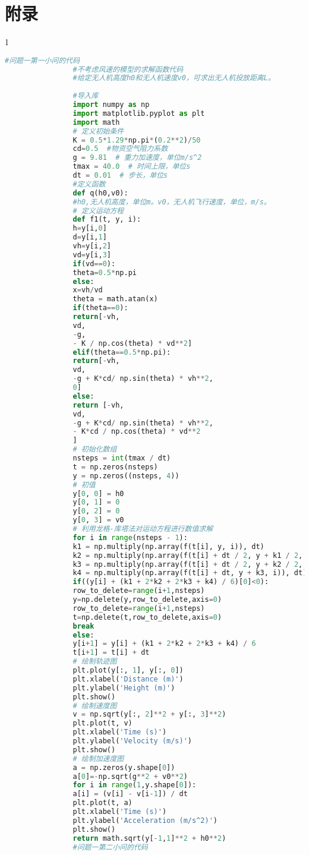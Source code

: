\documentclass[normalsize]{ctexart}
\begin{document}
		\section{附录}
			\usepackage{第一二问的Python源程序}
		\begin{spacing}{1}  
			\begin{lstlisting}[language={Python}]
				#问题一第一小问的代码
				#不考虑风速的模型的求解函数代码
				#给定无人机高度h0和无人机速度v0，可求出无人机投放距离L。
				
				#导入库
				import numpy as np
				import matplotlib.pyplot as plt
				import math
				# 定义初始条件
				K = 0.5*1.29*np.pi*(0.2**2)/50
				cd=0.5  #物资空气阻力系数
				g = 9.81  # 重力加速度，单位m/s^2
				tmax = 40.0  # 时间上限，单位s
				dt = 0.01  # 步长，单位s
				#定义函数
				def q(h0,v0):
				#h0,无人机高度，单位m。v0，无人机飞行速度，单位，m/s。
				# 定义运动方程
				def f1(t, y, i):
				h=y[i,0]
				d=y[i,1]
				vh=y[i,2]
				vd=y[i,3]
				if(vd==0):
				theta=0.5*np.pi
				else:
				x=vh/vd
				theta = math.atan(x)
				if(theta==0):
				return[-vh,
				vd,
				-g,
				- K / np.cos(theta) * vd**2]
				elif(theta==0.5*np.pi):
				return[-vh,
				vd,
				-g + K*cd/ np.sin(theta) * vh**2,
				0]
				else:
				return [-vh,
				vd,
				-g + K*cd/ np.sin(theta) * vh**2,
				- K*cd / np.cos(theta) * vd**2
				]
				# 初始化数组
				nsteps = int(tmax / dt)
				t = np.zeros(nsteps)
				y = np.zeros((nsteps, 4))
				# 初值
				y[0, 0] = h0
				y[0, 1] = 0 
				y[0, 2] = 0
				y[0, 3] = v0
				# 利用龙格-库塔法对运动方程进行数值求解
				for i in range(nsteps - 1):
				k1 = np.multiply(np.array(f(t[i], y, i)), dt)
				k2 = np.multiply(np.array(f(t[i] + dt / 2, y + k1 / 2, i)), dt)
				k3 = np.multiply(np.array(f(t[i] + dt / 2, y + k2 / 2, i)), dt)
				k4 = np.multiply(np.array(f(t[i] + dt, y + k3, i)), dt)
				if((y[i] + (k1 + 2*k2 + 2*k3 + k4) / 6)[0]<0):
				row_to_delete=range(i+1,nsteps)
				y=np.delete(y,row_to_delete,axis=0)
				row_to_delete=range(i+1,nsteps)
				t=np.delete(t,row_to_delete,axis=0)
				break
				else:
				y[i+1] = y[i] + (k1 + 2*k2 + 2*k3 + k4) / 6
				t[i+1] = t[i] + dt
				# 绘制轨迹图
				plt.plot(y[:, 1], y[:, 0])
				plt.xlabel('Distance (m)')
				plt.ylabel('Height (m)')
				plt.show()
				# 绘制速度图
				v = np.sqrt(y[:, 2]**2 + y[:, 3]**2)
				plt.plot(t, v)
				plt.xlabel('Time (s)')
				plt.ylabel('Velocity (m/s)')
				plt.show()
				# 绘制加速度图
				a = np.zeros(y.shape[0])
				a[0]=-np.sqrt(g**2 + v0**2)
				for i in range(1,y.shape[0]):
				a[i] = (v[i] - v[i-1]) / dt
				plt.plot(t, a)
				plt.xlabel('Time (s)')
				plt.ylabel('Acceleration (m/s^2)')
				plt.show()
				return math.sqrt(y[-1,1]**2 + h0**2)
				#问题一第二小问的代码
				

\end{lstlisting}
\end{spacing}
\end{document}
